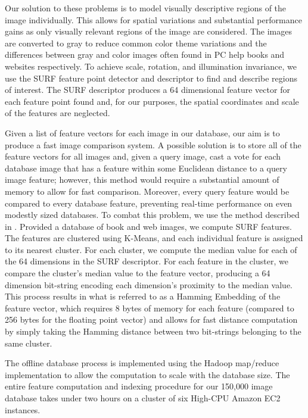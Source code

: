 \documentclass{www2010-submission}
\begin{document}
Our solution to these problems is to model visually descriptive
regions of the image individually.  This allows for spatial variations
and substantial performance gains as only visually relevant regions
of the image are considered.  The images are converted to gray to
reduce common color theme variations and the differences between gray
and color images often found in PC help books and websites
respectively.  To achieve scale, rotation, and illumination
invariance, we use the SURF feature point detector and descriptor
\cite{VanGool1370556} to find and describe regions of interest.  The
SURF descriptor produces a 64 dimensional feature vector for each
feature point found and, for our purposes, the spatial coordinates and
scale of the features are neglected.

Given a list of feature vectors for each image in our database, our
aim is to produce a fast image comparison system.  A possible solution
is to store all of the feature vectors for all images and, given a
query image, cast a vote for each database image that has a feature
within some Euclidean distance to a query image feature; however, this
method would require a substantial amount of memory to allow for fast
comparison.  Moreover, every query feature would be compared to every
database feature, preventing real-time performance on even modestly
sized databases.  To combat this problem, we use the method described
in \cite{Schmid1478419}.  Provided a database of book and web images,
we compute SURF features. The features are clustered using K-Means,
and each individual feature is assigned to its nearest cluster.  For
each cluster, we compute the median value for each of the 64
dimensions in the SURF descriptor.  For each feature in the cluster,
we compare the cluster's median value to the feature vector, producing
a 64 dimension bit-string encoding each dimension's proximity to the
median value.  This process results in what is referred to as a
Hamming Embedding of the feature vector, which requires 8 bytes of
memory for each feature (compared to 256 bytes for the floating point
vector) and allows for fast distance computation by simply taking the
Hamming distance between two bit-strings belonging to the same
cluster.

The offline database process is implemented using the Hadoop
map/reduce \cite{Ghemaqat1327492} implementation to allow the
computation to scale with the database size.  The entire feature
computation and indexing procedure for our 150,000 image database
takes under two hours on a cluster of six High-CPU Amazon EC2
instances.
\end{document}
